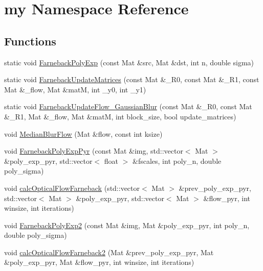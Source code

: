 \hypertarget{namespacemy}{}\section{my Namespace Reference}
\label{namespacemy}
\subsection*{Functions}
\begin{DoxyCompactItemize}
\item 
static void \hyperlink{namespacemy_a195edeea73a5667bbaabe20c9c369ce7}{Farneback\+Poly\+Exp} (const Mat \&src, Mat \&dst, int n, double sigma)
\item 
static void \hyperlink{namespacemy_a1618ca250804975e0f2f6713f67e5d08}{Farneback\+Update\+Matrices} (const Mat \&\+\_\+\+R0, const Mat \&\+\_\+\+R1, const Mat \&\+\_\+flow, Mat \&mat\+M, int \+\_\+y0, int \+\_\+y1)
\item 
static void \hyperlink{namespacemy_a4c2434c234366883fb13f6bc36707590}{Farneback\+Update\+Flow\+\_\+\+Gaussian\+Blur} (const Mat \&\+\_\+\+R0, const Mat \&\+\_\+\+R1, Mat \&\+\_\+flow, Mat \&mat\+M, int block\+\_\+size, bool update\+\_\+matrices)
\item 
void \hyperlink{namespacemy_ae9435daffac9af6cfa00756a579ba86d}{Median\+Blur\+Flow} (Mat \&flow, const int ksize)
\item 
void \hyperlink{namespacemy_ad985734c957006a836b8d56d373ced9d}{Farneback\+Poly\+Exp\+Pyr} (const Mat \&img, std\+::vector$<$ Mat $>$ \&poly\+\_\+exp\+\_\+pyr, std\+::vector$<$ float $>$ \&fscales, int poly\+\_\+n, double poly\+\_\+sigma)
\item 
void \hyperlink{namespacemy_aa7226ca3aea639def8602237f98dea9e}{calc\+Optical\+Flow\+Farneback} (std\+::vector$<$ Mat $>$ \&prev\+\_\+poly\+\_\+exp\+\_\+pyr, std\+::vector$<$ Mat $>$ \&poly\+\_\+exp\+\_\+pyr, std\+::vector$<$ Mat $>$ \&flow\+\_\+pyr, int winsize, int iterations)
\item 
void \hyperlink{namespacemy_a236e57a998e2596b4c1050c3d5464bfb}{Farneback\+Poly\+Exp2} (const Mat \&img, Mat \&poly\+\_\+exp\+\_\+pyr, int poly\+\_\+n, double poly\+\_\+sigma)
\item 
void \hyperlink{namespacemy_a65bdd5458ecc43dcaa1db19d87856ba8}{calc\+Optical\+Flow\+Farneback2} (Mat \&prev\+\_\+poly\+\_\+exp\+\_\+pyr, Mat \&poly\+\_\+exp\+\_\+pyr, Mat \&flow\+\_\+pyr, int winsize, int iterations)
\end{DoxyCompactItemize}


